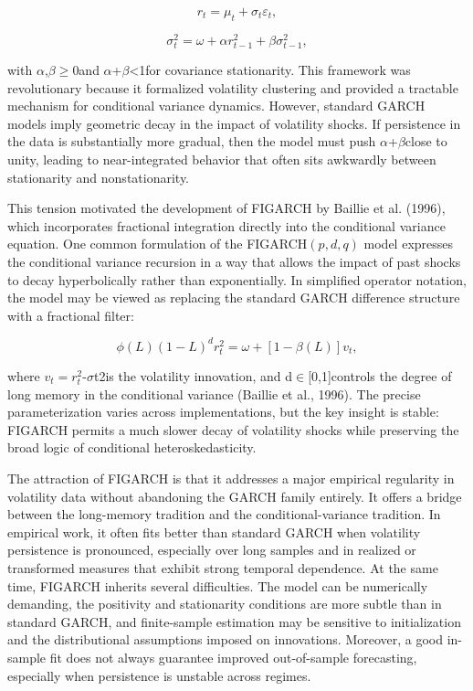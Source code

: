\documentclass[12pt]{article}
\begin{document}
\[r_t = \mu_t + \sigma_t \varepsilon_t,\]

\[\sigma_t^2 = \omega + \alpha r_{t-1}^2 + \beta \sigma_{t-1}^2,\]

with $\alpha$,$\beta$$\geq$0and $\alpha$+$\beta$<1for covariance stationarity. This framework was revolutionary because it formalized volatility clustering and provided a tractable mechanism for conditional variance dynamics. However, standard GARCH models imply geometric decay in the impact of volatility shocks. If persistence in the data is substantially more gradual, then the model must push $\alpha$+$\beta$close to unity, leading to near-integrated behavior that often sits awkwardly between stationarity and nonstationarity.

This tension motivated the development of FIGARCH by Baillie et al. (1996), which incorporates fractional integration directly into the conditional variance equation. One common formulation of the FIGARCH$(p,d,q)$ model expresses the conditional variance recursion in a way that allows the impact of past shocks to decay hyperbolically rather than exponentially. In simplified operator notation, the model may be viewed as replacing the standard GARCH difference structure with a fractional filter:

\[\phi(L)(1-L)^d r_t^2 = \omega + [1-\beta(L)]v_t,\]

where $v_t=r_t^2$-$\sigma$t2is the volatility innovation, and d$\in$[0,1]controls the degree of long memory in the conditional variance (Baillie et al., 1996). The precise parameterization varies across implementations, but the key insight is stable: FIGARCH permits a much slower decay of volatility shocks while preserving the broad logic of conditional heteroskedasticity.

The attraction of FIGARCH is that it addresses a major empirical regularity in volatility data without abandoning the GARCH family entirely. It offers a bridge between the long-memory tradition and the conditional-variance tradition. In empirical work, it often fits better than standard GARCH when volatility persistence is pronounced, especially over long samples and in realized or transformed measures that exhibit strong temporal dependence. At the same time, FIGARCH inherits several difficulties. The model can be numerically demanding, the positivity and stationarity conditions are more subtle than in standard GARCH, and finite-sample estimation may be sensitive to initialization and the distributional assumptions imposed on innovations. Moreover, a good in-sample fit does not always guarantee improved out-of-sample forecasting, especially when persistence is unstable across regimes.
\end{document}

